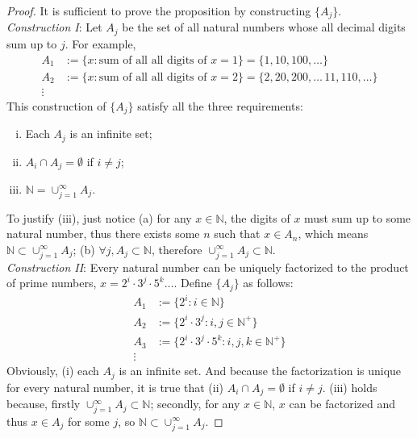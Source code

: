 \documentclass{article}
\newcommand{\N}{\mathbb{N}}
\begin{document}
\begin{proof}
It is sufficient to prove the proposition by constructing $\{ A_j \}$. \\

\emph{Construction I}: Let $A_j$ be the set of all natural numbers whose all
decimal digits sum up to $j$. For example,
\begin{align*}
  A_1 &:= \{x:\textrm{sum of all all digits of } x = 1\} =\{1,10,100,\dots\}\\
  A_2 &:= \{x:\textrm{sum of all all digits of } x = 2\}
          = \{2,20,200,\dots\, 11, 110, \dots \}\\
  \vdots
\end{align*}
This construction of $\{ A_j \}$ satisfy all the three requirements:
\begin{enumerate}[(i)]
  \item Each $A_j$ is an infinite set;
  \item $A_i \cap A_j = \emptyset$ if $i\neq j$;
  \item $\N = \cup_{j=1}^{\infty} A_j$.
\end{enumerate}
To justify (iii), just notice
(a) for any $x \in \N$, the digits of $x$ must sum up
to some natural number, thus there exists some $n$ such that $x \in A_n$,
which means $ \N \subset \cup_{j=1}^{\infty} A_j$;
(b) $\forall j, A_j \subset \N$, therefore $\cup_{j=1}^{\infty} A_j \subset \N$.
\\

\emph{Construction II}: Every natural number can be uniquely factorized to the product
of prime numbers, $x = 2^i \cdot 3^j \cdot 5^k \dots$.
Define $\{ A_j \}$ as follows:
\begin{align*}
  A_1 &:= \{ 2^i: i \in \N \} \\
  A_2 &:= \{ 2^i \cdot 3^j: i,j \in \N^+ \} \\
  A_3 &:= \{ 2^i \cdot 3^j \cdot 5^k: i,j,k \in \N^+ \} \\
  \vdots
\end{align*}
Obviously, (i) each $A_j$ is an infinite set. And because the factorization is unique
for every natural number, it is true that (ii) $A_i \cap A_j = \emptyset$ if $i\neq j$.
(iii) holds because, firstly $ \cup_{j=1}^{\infty} A_j \subset \N$; secondly,
for any $x \in \N$, $x$ can be factorized and thus $x \in A_j$ for some $j$,
so $\N \subset \cup_{j=1}^{\infty} A_j$.



\end{proof}
\end{document}
